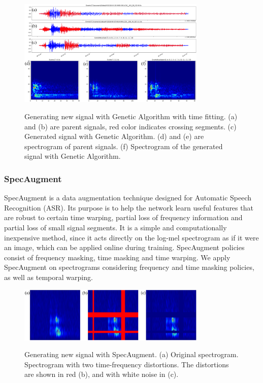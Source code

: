 \documentclass[journal]{IEEEtran}
\begin{document}
\begin{figure}
\centering
{\includegraphics[width=0.8\textwidth,keepaspectratio]{img/da_ag2.png}}
\caption{Generating new signal with Genetic Algorithm with time fitting. (a) and (b) are parent signals, red color indicates crossing segments. (c) Generated signal with Genetic Algorithm. (d) and (e) are spectrogram of parent signals. (f) Spectrogram of the generated signal with Genetic Algorithm.}
\label{fig:da_ga2}
\end{figure}

\subsubsection{SpecAugment}
SpecAugment is a data augmentation technique designed for Automatic Speech Recognition (ASR).  Its purpose is to help the network learn useful features that are robust to certain time warping, partial loss of frequency information and partial loss of small signal segments.  It is a simple and computationally inexpensive method, since it acts directly on the log-mel spectrogram as if it were an image, which can be applied online during training\cite{park2019specaugment}.
SpecAugment policies consist of frequency masking, time masking and time warping\cite{park2020specaugment,soni2024generalized}.
We apply SpecAugment on spectrograms considering frequency and time masking policies, as well as temporal warping.
\begin{figure}
\centering
{\includegraphics[width=0.8\textwidth,keepaspectratio]{img/da_specaugment.png}}
\caption{Generating new signal with SpecAugment. (a) Original spectrogram. Spectrogram with two time-frequency distortions. The distortions are shown in red (b), and with white noise in (c).}
\label{fig:da_specaugment}
\end{figure}
\end{document}
